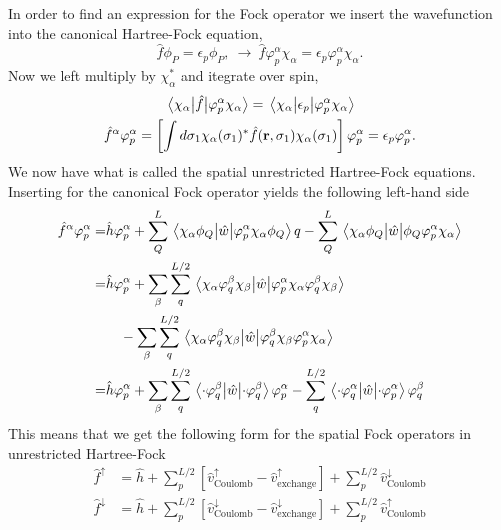 In order to find an expression for the Fock operator we insert the wavefunction into the 
canonical Hartree-Fock equation,
\begin{equation}
    \hat{f}\phi_P = \epsilon_p\phi_P, \ \to \ 
    \hat{f}\varphi_p^\alpha \chi_\alpha = \epsilon_p\varphi_p^\alpha \chi_\alpha. 
\end{equation}
Now we left multiply by $\chi_\alpha^*$ and itegrate over spin,
\begin{gather}
    \mel{\chi_\alpha}{\hat{f}}{\varphi_p^\alpha\chi_\alpha}
    = \mel{\chi_\alpha}{\epsilon_p}{\varphi_p^\alpha\chi_\alpha} \\
    \hat{f}^\alpha \varphi_p^\alpha
    = \left[ 
        \int d\sigma_1 \chi_\alpha(\sigma_1)^*\hat{f}(\vb{r}, \sigma_1)\chi_\alpha(\sigma_1)     
    \right] \varphi_p^\alpha
    = \epsilon_p\varphi_p^\alpha.
\end{gather}
We now have what is called the spatial unrestricted Hartree-Fock equations. Inserting for 
the canonical Fock operator yields the following left-hand side
\begin{equation}
    \begin{aligned}
        \hat{f}^\alpha\varphi_p^\alpha 
        =& \hat{h}\varphi_p^\alpha 
        + \sum_Q^L \mel{\chi_\alpha \phi_Q}{\hat{w}}{\varphi_p^\alpha\chi_\alpha\phi_Q}q
        - \sum_Q^L \mel{\chi_\alpha \phi_Q}{\hat{w}}{\phi_Q\varphi_p^\alpha\chi_\alpha} \\
        =& \hat{h}\varphi_p^\alpha
        + \sum_\beta \sum_q^{L/2}
            \mel{\chi_\alpha\varphi^\beta_q\chi_\beta}{\hat{w}}{\varphi^\alpha_p\chi_\alpha\varphi^\beta_q\chi_\beta} \\
        & \quad - \sum_\beta \sum_q^{L/2}
            \mel{\chi_\alpha\varphi^\beta_q\chi_\beta}{\hat{w}}{\varphi^\beta_q\chi_\beta\varphi^\alpha_p\chi_\alpha} \\
        =& \hat{h} \varphi_p^\alpha
        + \sum_\beta \sum_q^{L/2}
            \mel{\cdot\varphi_q^\beta}{\hat{w}}{\cdot\varphi_q^\beta}\varphi_p^\alpha
        - \sum_q^{L/2}
            \mel{\cdot\varphi_q^\alpha}{\hat{w}}{\cdot\varphi_p^\alpha}\varphi_q^\beta
    \end{aligned}
\end{equation} 
This means that we get the following form for the spatial Fock operators in unrestricted Hartree-Fock 
\begin{align}
\label{eq:fock_up_uhf}
\hat{f}^\uparrow &= 
    \hat{h} + \sum_p^{L/2}[\hat{v}^\uparrow_{\text{Coulomb}} - \hat{v}^\uparrow_{\text{exchange}}]
    + \sum_p^{L/2}\hat{v}^\downarrow_{\text{Coulomb}}  \\
\label{eq:fock_down_uhf}
\hat{f}^\downarrow &= 
    \hat{h} + \sum_p^{L/2}[\hat{v}^\downarrow_{\text{Coulomb}} - \hat{v}^\downarrow_{\text{exchange}}]
    + \sum_p^{L/2}\hat{v}^\uparrow_{\text{Coulomb}}
\end{align}
